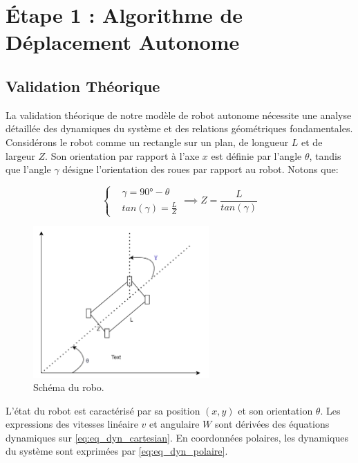 

\section{Étape 1 : Algorithme de Déplacement Autonome}

\subsection{Validation Théorique}

La validation théorique de notre modèle de robot autonome nécessite une analyse détaillée des dynamiques du système et des relations géométriques fondamentales. Considérons le robot comme un rectangle sur un plan, de longueur $L$ et de largeur $Z$. Son orientation par rapport à l'axe $x$ est définie par l'angle $\theta$, tandis que l'angle $\gamma$ désigne l'orientation des roues par rapport au robot. Notons que: 


\begin{equation*}
    \left\{
    \begin{align}
        & \gamma = 90° - \theta\\
        & tan(\gamma) = \frac{L}{Z} 
    \end{align}
    \right. \implies Z = \frac{L}{tan(\gamma)}
\end{equation*}


\begin{figure}[!h]
    \centering
    \includegraphics[width=0.6\textwidth]{img/diagrams/1schema_robo.png} 
    \caption{Schéma du robo.}
    \label{img-abc_dq}
\end{figure}


L'état du robot est caractérisé par sa position $(x, y)$ et son orientation $\theta$. Les expressions des vitesses linéaire $v$ et angulaire $W$ sont dérivées des équations dynamiques sur \ref{eq:eq_dyn_cartesian}. En coordonnées polaires, les dynamiques du système sont exprimées par \ref{eq:eq_dyn_polaire}.

